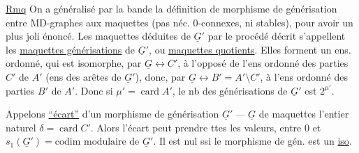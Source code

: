 \uline{Rmq} On a généralisé par la bande la définition de morphisme de générisation entre MD-graphes aux maquettes (pas néc. $0$-connexes, ni stables), pour avoir un plus joli énoncé. Les maquettes déduites de $\underline{G}'$ par le procédé décrit s'appellent les \uline{maquettes générisations} de $\underline{G}'$, ou \uline{maquettes quotients}. Elles forment un ens. ordonné, qui est isomorphe, par $\underline{G}\longleftrightarrow C'$, à l'opposé de l'ens ordonné des parties $C'$ de $A'$ (ens des arêtes de $\underline{G}'$), donc, par $\underline{G}\longleftrightarrow B'=A'\setminus C'$, à l'ens ordonné des parties $B'$ de $A'$. Donc si $\mu'=\operatorname{card}A'$, le nb des générisations de $\underline{G}'$ est $2^{\mu'}$.

Appelons \uline{``écart''} d'un morphisme de générisation $\underline{G}'\mathbin{\text{---}}\underline{G}$ de maquettes l'entier naturel $\delta=\operatorname{card}C'$. Alors l'écart     peut prendre ttes les valeurs, entre $0$ et $s_1(\underline{G}')=\text{codim modulaire de }\underline{G}'$. Il est nul ssi le morphisme de gén. est un \uline{iso}.
